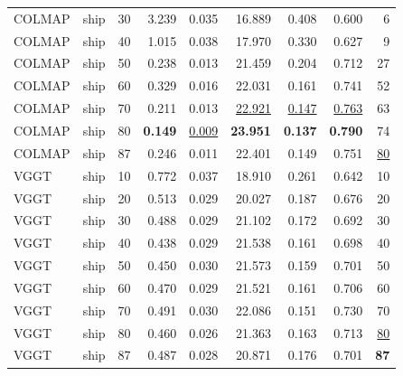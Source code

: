 \begin{table}[H]
\begin{tabular}{llrrrrrrr}
COLMAP & ship & 30 & 3.239 & 0.035 & 16.889 & 0.408 & 0.600 & 6 \\
COLMAP & ship & 40 & 1.015 & 0.038 & 17.970 & 0.330 & 0.627 & 9 \\
COLMAP & ship & 50 & 0.238 & 0.013 & 21.459 & 0.204 & 0.712 & 27 \\
COLMAP & ship & 60 & 0.329 & 0.016 & 22.031 & 0.161 & 0.741 & 52 \\
COLMAP & ship & 70 & 0.211 & 0.013 & \underline{22.921} & \underline{0.147} & \underline{0.763} & 63 \\
COLMAP & ship & 80 & \textbf{0.149} & \underline{0.009} & \textbf{23.951} & \textbf{0.137} & \textbf{0.790} & 74 \\
COLMAP & ship & 87 & 0.246 & 0.011 & 22.401 & 0.149 & 0.751 & \underline{80} \\
VGGT & ship & 10 & 0.772 & 0.037 & 18.910 & 0.261 & 0.642 & 10 \\
VGGT & ship & 20 & 0.513 & 0.029 & 20.027 & 0.187 & 0.676 & 20 \\
VGGT & ship & 30 & 0.488 & 0.029 & 21.102 & 0.172 & 0.692 & 30 \\
VGGT & ship & 40 & 0.438 & 0.029 & 21.538 & 0.161 & 0.698 & 40 \\
VGGT & ship & 50 & 0.450 & 0.030 & 21.573 & 0.159 & 0.701 & 50 \\
VGGT & ship & 60 & 0.470 & 0.029 & 21.521 & 0.161 & 0.706 & 60 \\
VGGT & ship & 70 & 0.491 & 0.030 & 22.086 & 0.151 & 0.730 & 70 \\
VGGT & ship & 80 & 0.460 & 0.026 & 21.363 & 0.163 & 0.713 & \underline{80} \\
VGGT & ship & 87 & 0.487 & 0.028 & 20.871 & 0.176 & 0.701 & \textbf{87} \\
\bottomrule
\end{tabular}
\end{table}